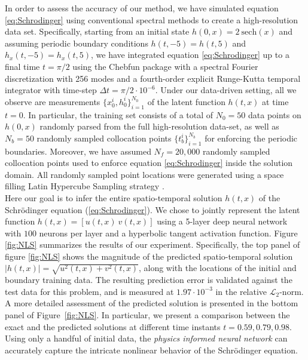 In order to assess the accuracy of our method, we have simulated equation \eqref{eq:Schrodinger} using conventional spectral methods to create a high-resolution data set. Specifically, starting from an initial state $h(0,x) = 2\ \text{sech}(x)$ and assuming periodic boundary conditions $h(t,-5) = h(t,5)$ and $h_x(t,-5) = h_x(t,5)$, we have integrated equation \eqref{eq:Schrodinger} up to a final time $t=\pi/2$ using the Chebfun package \cite{driscoll2014chebfun} with a spectral Fourier discretization with 256 modes and a fourth-order explicit Runge-Kutta temporal integrator with time-step $\Delta{t} = \pi/2 \cdot 10^{-6}$. Under our data-driven setting, all we observe are measurements $\{x_0^i, h^i_0\}_{i=1}^{N_0}$ of the latent function $h(t,x)$ at time $t=0$. In particular, the training set consists of a total of $N_0 = 50$ data points on $h(0,x)$ randomly parsed from the full high-resolution data-set, as well as $N_b = 50$ randomly sampled collocation points $\{t^i_b\}_{i=1}^{N_b}$ for enforcing the periodic boundaries. Moreover, we have assumed $N_f=20,000$ randomly sampled collocation points used to enforce equation \eqref{eq:Schrodinger} inside the solution domain. All randomly sampled point locations were generated using a space filling Latin Hypercube Sampling strategy \cite{stein1987large}.\\

Here our goal is to infer the entire spatio-temporal solution $h(t,x)$ of the Schr\"{o}dinger equation (\ref{eq:Schrodinger}). We chose to jointly represent the latent function $h(t,x) = [u(t,x)\ v(t,x)]$ using a 5-layer deep neural network with $100$ neurons per layer and a hyperbolic tangent activation function. Figure \ref{fig:NLS} summarizes the results of our experiment. Specifically, the top panel of figure \ref{fig:NLS} shows the magnitude of the predicted spatio-temporal solution $|h(t,x)|=\sqrt{u^2(t,x) + v^2(t,x)}$, along with the locations of the initial and boundary training data. The resulting prediction error is validated against the test data for this problem, and is measured at $1.97 \cdot 10^{-3}$ in the relative $\mathcal{L}_2$-norm. A more detailed assessment of the predicted solution is presented in the bottom panel of Figure~\ref{fig:NLS}. In particular, we present a comparison between the exact and the predicted solutions at different time instants $t=0.59,0.79,0.98$. Using only a handful of initial data, the {\em physics informed neural network} can accurately capture the intricate nonlinear behavior of the Schr\"{o}dinger equation.\\

